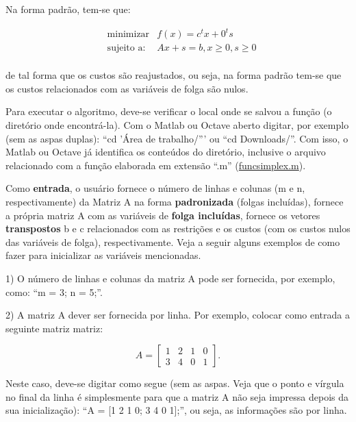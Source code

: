 \documentclass[10pt]{article}
\begin{document}
Na forma padrão, tem-se que:

\begin{align*}
&\text{minimizar}& f(x) = c^{t}x + 0^{t}s\\  
&\text{sujeito a:}& Ax + s = b, x \ge 0, s \ge 0\\
\end{align*}  

de tal forma que os custos são reajustados, ou seja, na forma padrão tem-se que os custos relacionados com as variáveis de folga são nulos.
\newline

Para executar o algoritmo, deve-se verificar o local onde se salvou a função (o diretório onde encontrá-la). Com o Matlab ou Octave aberto digitar, por exemplo (sem as aspas duplas): ``cd 'Área de trabalho/''' ou ``cd Downloads/''. Com isso, o Matlab ou Octave já identifica os conteúdos do diretório, inclusive o arquivo relacionado com a função elaborada em extensão ``.m'' (\underline{funcsimplex.m}).
\newline

Como \textbf{entrada}, o usuário fornece o número de linhas e colunas (m e n, respectivamente) da Matriz A na forma \textbf{padronizada} (folgas incluídas), fornece a própria matriz A com as variáveis de \textbf{folga incluídas}, fornece os vetores \textbf{transpostos} b e c relacionados com as restrições e os custos (com os custos nulos das variáveis de folga), respectivamente. Veja a seguir alguns exemplos de como fazer para inicializar as variáveis mencionadas.
\newline

1) O número de linhas e colunas da matriz A pode ser fornecida, por exemplo, como: ``m = 3; n = 5;''.
\newline

2) A matriz A dever ser fornecida por linha. Por exemplo, colocar como entrada a seguinte matriz matriz:

\[
A =
  \begin{bmatrix}
    1 & 2 & 1 & 0\\
    3 & 4 & 0 & 1
  \end{bmatrix}.
\]
\newline

Neste caso, deve-se digitar como segue (sem as aspas. Veja que o ponto e vírgula no final da linha é simplesmente para que a matriz A não seja impressa depois da sua inicialização): ``A = [1 2 1 0; 3 4 0 1];'', ou seja, as informações são por linha.
\newline
\end{document}
